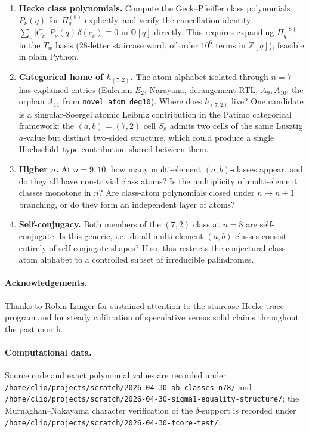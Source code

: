 \documentclass[11pt]{article}
\theoremstyle{definition}
\theoremstyle{remark}
\newcommand{\bbZ}{\mathbb{Z}}
\newcommand{\bbQ}{\mathbb{Q}}
\newcommand{\Pq}{\Pi_q}
\begin{document}
\begin{enumerate}
\item \textbf{Hecke class polynomials.}  Compute the Geck--Pfeiffer
class polynomials $P_\nu(q)$ for $\Pq^{(8)}$ explicitly, and verify
the cancellation identity $\sum_\nu |C_\nu|\,P_\nu(q)\,\delta(c_\nu)
\equiv 0$ in $\bbQ[q]$ directly.  This requires expanding
$\Pq^{(8)}$ in the $T_w$ basis ($28$-letter staircase word, of order
$10^{6}$ terms in $\bbZ[q]$); feasible in plain Python.
\item \textbf{Categorical home of $h_{(7,2)}$.}  The atom alphabet
isolated through $n=7$ has explained entries (Eulerian $E_2$,
Narayana, derangement-RTL, $A_9, A_{10}$, the orphan $A_{11}$ from
\texttt{novel\_atom\_deg10}).  Where does $h_{(7,2)}$ live?  One
candidate is a singular-Soergel atomic Leibniz contribution in the
Patimo categorical framework: the $(a,b) = (7,2)$ cell $S_8$ admits
two cells of the same Lusztig $a$-value but distinct
two-sided structure, which could produce a single Hochschild--type
contribution shared between them.
\item \textbf{Higher $n$.}  At $n = 9, 10$, how many multi-element
$(a,b)$-classes appear, and do they all have non-trivial class
atoms?  Is the multiplicity of multi-element classes monotone in
$n$?  Are class-atom polynomials closed under $n \mapsto n+1$
branching, or do they form an independent layer of atoms?
\item \textbf{Self-conjugacy.}  Both members of the $(7,2)$ class at
$n=8$ are self-conjugate.  Is this generic, i.e.\ do all
multi-element $(a,b)$-classes consist entirely of self-conjugate
shapes?  If so, this restricts the conjectural class-atom alphabet
to a controlled subset of irreducible palindromes.
\end{enumerate}

\paragraph{Acknowledgements.} Thanks to Robin Langer for sustained
attention to the staircase Hecke trace program and for steady
calibration of speculative versus solid claims throughout the past
month.

\paragraph{Computational data.} Source code and exact polynomial
values are recorded under
\verb|/home/clio/projects/scratch/2026-04-30-ab-classes-n78/| and
\verb|/home/clio/projects/scratch/2026-04-30-sigma1-equality-structure/|;
the Murnaghan--Nakayama character verification of the
$\delta$-support is recorded under
\verb|/home/clio/projects/scratch/2026-04-30-tcore-test/|.
\end{document}

